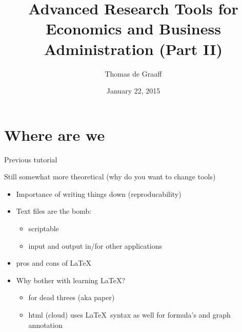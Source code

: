 \documentclass[ignorenonframetext,]{beamer}
\title{Advanced Research Tools for Economics and Business Administration (Part
II)}
\author{Thomas de Graaff}
\date{January 22, 2015}
\begin{document}
\frame{\titlepage}

\section{Where are we}\label{where-are-we}

\begin{frame}{Previous tutorial}

Still somewhat more theoretical (why do you want to change tools)

\begin{itemize}
\item
  Importance of writing things down (reproducability)
\item
  Text files are the bomb:

  \begin{itemize}
  \itemsep1pt\parskip0pt
  \item
    scriptable
  \item
    input and output in/for other applications
  \end{itemize}
\item
  pros and cons of \LaTeX
\item
  Why bother with learning \LaTeX?

  \begin{itemize}
  \itemsep1pt\parskip0pt
  \item
    for dead threes (aka paper)
  \item
    html (cloud) uses \LaTeX~syntax as well for formula's and graph
    annotation
  \end{itemize}
\end{itemize}

\end{frame}
\end{document}

